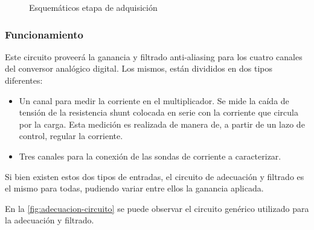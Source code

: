 \documentclass[../et.tex]{subfiles}
\begin{document}
\begin{figure}[!htbp]
  \label{fig:adquisicion}
  \caption{Esquemáticos etapa de adquisición}
\end{figure}

  \subsubsection{Funcionamiento}
  Este circuito proveerá la ganancia y filtrado anti-aliasing para los cuatro canales del conversor analógico digital. Los mismos, están divididos en dos tipos diferentes:
  \begin{itemize}
      \item Un canal para medir la corriente en el multiplicador. Se mide la caída de tensión de la resistencia shunt colocada en serie con la corriente que circula por la carga. Esta medición es realizada de manera de, a partir de un lazo de control, regular la corriente.
      \item Tres canales para la conexión de las sondas de corriente a caracterizar.
  \end{itemize}

  Si bien existen estos dos tipos de entradas, el circuito de adecuación y filtrado es el mismo para todas, pudiendo variar entre ellos la ganancia aplicada.

  En la \autoref{fig:adecuacion-circuito} se puede observar el circuito genérico utilizado para la adecuación y filtrado.
\end{document}
